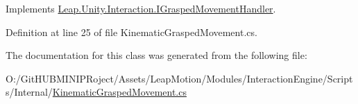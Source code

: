 Implements \mbox{\hyperlink{interface_leap_1_1_unity_1_1_interaction_1_1_i_grasped_movement_handler_a49da4845ba5c20aa1ff075745b634c78}{Leap.\+Unity.\+Interaction.\+I\+Grasped\+Movement\+Handler}}.



Definition at line 25 of file Kinematic\+Grasped\+Movement.\+cs.



The documentation for this class was generated from the following file\+:\begin{DoxyCompactItemize}
\item 
O\+:/\+Git\+H\+U\+B\+M\+I\+N\+I\+P\+Roject/\+Assets/\+Leap\+Motion/\+Modules/\+Interaction\+Engine/\+Scripts/\+Internal/\mbox{\hyperlink{_kinematic_grasped_movement_8cs}{Kinematic\+Grasped\+Movement.\+cs}}\end{DoxyCompactItemize}
